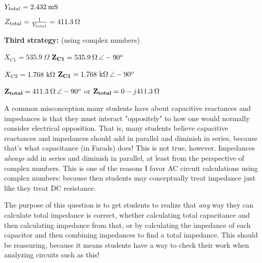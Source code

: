 $Y_{total} = 2.432 \> \hbox{mS}$

\vskip 5pt

$Z_{total} = {1 \over Y_{total}} = 411.3 \> \Omega$

\vskip 10pt

\goodbreak

\noindent
{\bf Third strategy:} (using complex numbers)

$X_{C1} = 535.9 \> \Omega$ \hskip 10pt ${\bf Z_{C1}} = 535.9 \> \Omega \> \angle -90^o$

$X_{C2} = 1.768 \hbox{ k}\Omega$ \hskip 10pt ${\bf Z_{C1}} = 1.768 \hbox{ k}\Omega \> \angle -90^o$

${\bf Z_{total}} = 411.3 \> \Omega \> \angle -90^o$ or ${\bf Z_{total}} = 0 - j411.3 \> \Omega$







A common misconception many students have about capacitive reactances and impedances is that they must interact "oppositely" to how one would normally consider electrical opposition.  That is, many students believe capacitive reactances and impedances should add in parallel and diminish in series, because that's what capacitance (in Farads) does!  This is not true, however.  Impedances {\it always} add in series and diminish in parallel, at least from the perspective of complex numbers.  This is one of the reasons I favor AC circuit calculations using complex numbers: because then students may conceptually treat impedance just like they treat DC resistance.

The purpose of this question is to get students to realize that {\it any} way they can calculate total impedance is correct, whether calculating total capacitance and then calculating impedance from that, or by calculating the impedance of each capacitor and then combining impedances to find a total impedance.  This should be reassuring, because it means students have a way to check their work when analyzing circuits such as this!




